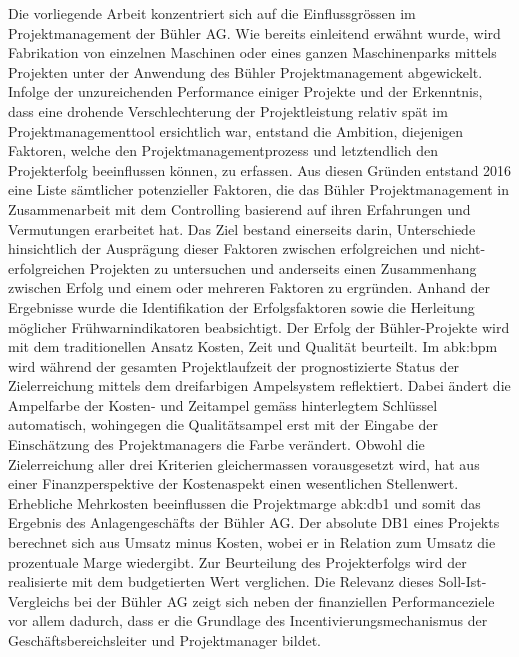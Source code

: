 Die vorliegende Arbeit konzentriert sich auf die Einflussgrössen im Projektmanagement der Bühler AG. Wie bereits einleitend erwähnt wurde, wird Fabrikation von einzelnen Maschinen oder eines ganzen Maschinenparks mittels Projekten unter der Anwendung des Bühler Projektmanagement abgewickelt. Infolge der unzureichenden Performance einiger Projekte und der Erkenntnis, dass eine drohende Verschlechterung der Projektleistung relativ spät im Projektmanagementtool ersichtlich war, entstand die Ambition, diejenigen Faktoren, welche den Projektmanagementprozess und letztendlich den Projekterfolg beeinflussen können, zu erfassen. Aus diesen Gründen entstand 2016 eine Liste sämtlicher potenzieller Faktoren, die das Bühler Projektmanagement in Zusammenarbeit mit dem Controlling basierend auf ihren Erfahrungen und Vermutungen erarbeitet hat. Das Ziel bestand einerseits darin, Unterschiede hinsichtlich der Ausprägung dieser Faktoren zwischen erfolgreichen und nicht-erfolgreichen Projekten zu untersuchen und anderseits einen Zusammenhang zwischen Erfolg und einem oder mehreren Faktoren zu ergründen. Anhand der Ergebnisse wurde die Identifikation der Erfolgsfaktoren sowie die Herleitung möglicher Frühwarnindikatoren beabsichtigt. Der Erfolg der Bühler-Projekte wird mit dem traditionellen Ansatz Kosten, Zeit und Qualität beurteilt. Im \gls{abk:bpm} wird während der gesamten Projektlaufzeit der prognostizierte Status der Zielerreichung mittels dem dreifarbigen Ampelsystem reflektiert. Dabei ändert die Ampelfarbe der Kosten- und Zeitampel gemäss hinterlegtem Schlüssel automatisch, wohingegen die Qualitätsampel erst mit der Eingabe der Einschätzung des Projektmanagers die Farbe verändert. Obwohl die Zielerreichung aller drei Kriterien gleichermassen vorausgesetzt wird, hat aus einer Finanzperspektive der Kostenaspekt einen wesentlichen Stellenwert. Erhebliche Mehrkosten beeinflussen die Projektmarge \gls{abk:db1} und somit das Ergebnis des Anlagengeschäfts der Bühler AG. Der absolute DB1 eines Projekts berechnet sich aus Umsatz minus Kosten, wobei er in Relation zum Umsatz die prozentuale Marge wiedergibt. Zur Beurteilung des Projekterfolgs wird der realisierte mit dem budgetierten Wert verglichen. Die Relevanz dieses Soll-Ist-Vergleichs bei der Bühler AG zeigt sich neben der finanziellen Performanceziele vor allem dadurch, dass er die Grundlage des Incentivierungsmechanismus der Geschäftsbereichsleiter und Projektmanager bildet. 
